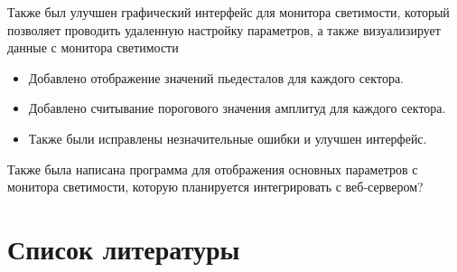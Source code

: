 \documentclass[a4paper, 12pt]{article}
\begin{document}
    Также был улучшен графический интерфейс для монитора светимости, который позволяет проводить удаленную настройку параметров, а также визуализирует данные с монитора светимости
    \begin{itemize} 
        \item Добавлено отображение значений пьедесталов для каждого сектора.
        \item Добавлено считывание порогового значения амплитуд для каждого сектора.
        \item Также были исправлены незначительные ошибки и улучшен интерфейс.
    \end{itemize}
    
    Также была написана программа для отображения основных параметров с монитора светимости, которую планируется интегрировать с веб-сервером?
\section*{Список литературы}
\end{document}
